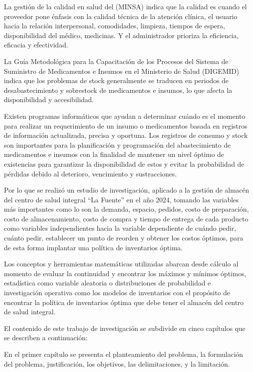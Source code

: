 \begin{introduccion}
La gestión de la calidad en salud del (MINSA) indica que la calidad es cuando el proveedor pone énfasis con la calidad técnica de la atención clínica, el usuario hacia la relación interpersonal, comodidades, limpieza, tiempos de espera, disponibilidad del médico, medicinas. Y el administrador prioriza la eficiencia, eficacia y efectividad.

La Guía Metodológica para la Capacitación de los Procesos del Sistema de Suministro de Medicamentos e Insumos en el Ministerio de Salud (DIGEMID) indica que los problemas de stock generalmente se traducen en periodos de desabastecimiento y sobrestock de medicamentos e insumos, lo que afecta la disponibilidad y accesibilidad.

Existen programas informáticos que ayudan a determinar cuándo es el momento para realizar un requerimiento de un insumo o medicamentos basada en registros de información actualizada, precisa y oportuna. Los registros de consumo y stock son importantes para la planificación y programación del abastecimiento de medicamentos e insumos con la finalidad de mantener un nivel óptimo de existencias para garantizar la disponibilidad de estos y evitar la probabilidad de pérdidas debido al deterioro, vencimiento y sustracciones.

Por lo que se realizó un estudio de investigación, aplicado a la gestión de almacén del centro de salud integral ``La Fuente'' en el año 2024, tomando las variables más importantes como lo son la demanda, espacio, pedidos, costo de preparación, costo de almacenamiento, costo de compra y tiempo de entrega de cada producto como variables independientes hacia la variable dependiente de cuándo pedir, cuánto pedir, establecer un punto de reorden y obtener los costos óptimos, para de esta forma implantar una política de inventarios óptima.

Los conceptos y herramientas matemáticas utilizadas abarcan desde cálculo al momento de evaluar la continuidad y encontrar los máximos y mínimos óptimos, estadística como variable aleatoria o distribuciones de probabilidad e investigación operativa como los modelos de inventarios con el propósito de encontrar la política de inventarios óptima que debe tener el almacén del centro de salud integral.

El contenido de este trabajo de investigación se subdivide en cinco capítulos que se describen a continuación:

En el primer capítulo se presenta el planteamiento del problema, la formulación del problema, justificación, los objetivos, las delimitaciones, y la limitación.


\end{introduccion}
